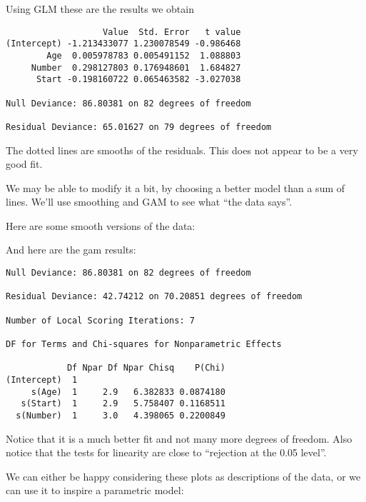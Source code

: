 Using GLM these are the results we obtain
\renewcommand{\baselinestretch}{1}
\begin{verbatim}
                   Value  Std. Error   t value 
(Intercept) -1.213433077 1.230078549 -0.986468
        Age  0.005978783 0.005491152  1.088803
     Number  0.298127803 0.176948601  1.684827
      Start -0.198160722 0.065463582 -3.027038

Null Deviance: 86.80381 on 82 degrees of freedom

Residual Deviance: 65.01627 on 79 degrees of freedom
\end{verbatim}
\renewcommand{\baselinestretch}{2}

\centerline{}

The dotted lines are smooths of the residuals. This does not appear to
be a very good fit. 

We may be able to modify it a bit, by choosing a better model than a
sum of lines. We'll use smoothing and GAM to see what ``the data says''.

Here are some smooth versions of the data:

\centerline{}

And here are the gam results:

\renewcommand{\baselinestretch}{1}
\begin{verbatim}
Null Deviance: 86.80381 on 82 degrees of freedom

Residual Deviance: 42.74212 on 70.20851 degrees of freedom

Number of Local Scoring Iterations: 7 

DF for Terms and Chi-squares for Nonparametric Effects

            Df Npar Df Npar Chisq    P(Chi) 
(Intercept)  1                             
     s(Age)  1     2.9   6.382833 0.0874180
   s(Start)  1     2.9   5.758407 0.1168511
  s(Number)  1     3.0   4.398065 0.2200849
\end{verbatim}
\renewcommand{\baselinestretch}{2}

Notice that it is a much better fit and not many more degrees of
freedom. Also notice that the tests for linearity are close to
``rejection at the 0.05 level''.

\centerline{}

We can either be happy considering these plots as descriptions of the
data, or we can use it to inspire a parametric model:

